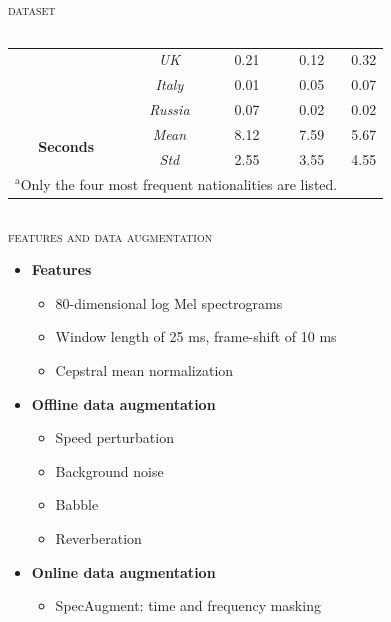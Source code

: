 \documentclass[10pt,aspectratio=1610,professionalfont]{beamer}
\begin{document}
\begin{frame}{\textsc{dataset}}
\begin{columns}
\begin{column}{0.5\textwidth}
\begin{center}
\begin{table}[htbp]
\begin{center}
{\begin{tabular}{|c|c|c|c|c|}
			        & \textit{UK} & 0.21 & 0.12 & 0.32 \\
			        & \textit{Italy} & 0.01 & 0.05 & 0.07 \\
			        & \textit{Russia} & 0.07 & 0.02 & 0.02 \\
			        \hline
			        \multirow{2}{*}{\textbf{Seconds}} & \textit{Mean} & 8.12 & 7.59 & 5.67 \\
			        & \textit{Std} & 2.55 & 3.55 & 4.55 \\
			        \hline
			        \multicolumn{4}{l}{$^{\mathrm{a}}$Only the four most frequent nationalities are listed.}
			        \end{tabular}
				}
			        \label{tab:dataset}
			    \end{center}
			\end{table}
		\end{center}
		\end{column}
	\end{columns}
   
\end{frame}

\begin{frame}{\textsc{features and data augmentation}}
    \begin{itemize}
        \item \textbf{Features}
        \begin{itemize}
            \item 80-dimensional log Mel spectrograms
            \item Window length of 25 ms, frame-shift of 10 ms
            \item Cepstral mean normalization  
        \end{itemize} 
        \item \textbf{Offline data augmentation}
        \begin{itemize}
            \item Speed perturbation
		\item Background noise
		\item Babble
		\item Reverberation 
        \end{itemize}
        \item \textbf{Online data augmentation}
        \begin{itemize}
            \item SpecAugment: time and frequency masking
        \end{itemize} 
    \end{itemize}
\end{frame}
\end{document}
